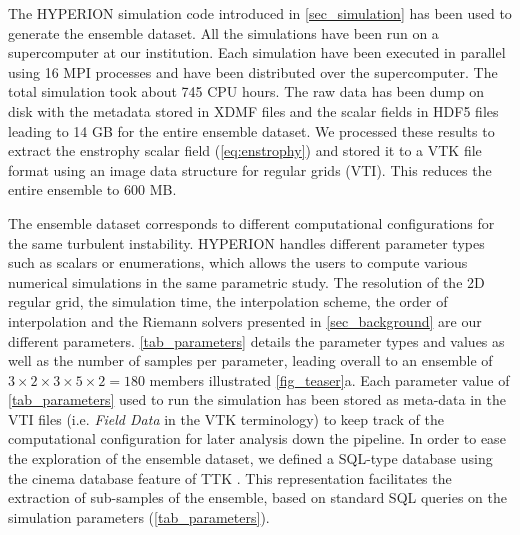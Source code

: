 
The HYPERION simulation code introduced in \autoref{sec_simulation} has been 
used to generate the ensemble dataset. All the simulations have been run on a 
supercomputer 
at our institution. Each simulation have been executed in parallel using 16 MPI processes and have been distributed over the supercomputer. The total 
simulation took about 745 CPU hours. The raw data has been dump on disk with the 
metadata stored in XDMF files and the scalar fields in HDF5 files leading to 14 
GB for the entire ensemble dataset. We processed these results to extract the 
enstrophy scalar field (\autoref{eq:enstrophy}) and stored it to a VTK file 
format \cite{Kitware:2003} using an image data structure for regular grids 
(VTI). This reduces the entire ensemble to 600 MB. 

The ensemble dataset corresponds to different computational configurations for 
the same turbulent instability. HYPERION handles different parameter types such 
as scalars or enumerations, which allows the users to compute various numerical 
simulations in the same parametric study. The resolution of the 2D regular grid, 
the simulation time, the interpolation scheme, the order of interpolation and 
the Riemann solvers presented in \autoref{sec_background} are our different 
parameters. \autoref{tab_parameters} details the parameter types and values as 
well as the number of samples per parameter, leading overall to an ensemble of 
$3\times2\times3\times5\times2=180$ members illustrated \autoref{fig_teaser}a. 
Each parameter value of \autoref{tab_parameters} used to run the simulation has 
been stored as meta-data in the VTI files (i.e. \emph{Field Data} in the VTK 
terminology)  to keep track of the computational configuration for later 
analysis down the pipeline.
In order to ease the exploration of the ensemble dataset, we defined a 
SQL-type database using the cinema database feature of TTK \cite{ttk17, ttk19}. 
This representation facilitates the extraction of sub-samples of the ensemble, 
based on standard SQL queries on the simulation parameters 
(\autoref{tab_parameters}).




